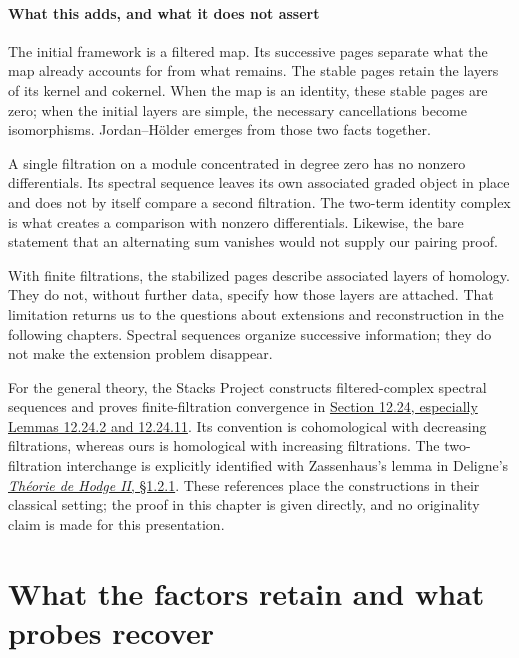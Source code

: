 \documentclass[11pt]{article}
\theoremstyle{definition}
\theoremstyle{remark}\newtheorem{remark}[theorem]{Remark}
\begin{document}
\subsection{What this adds, and what it does not assert}

The initial framework is a filtered map. Its successive pages separate
what the map already accounts for from what remains. The stable pages
retain the layers of its kernel and cokernel. When the map is an identity,
these stable pages are zero; when the initial layers are simple, the
necessary cancellations become isomorphisms. Jordan--H\"older emerges
from those two facts together.

A single filtration on a module concentrated in degree zero has no
nonzero differentials. Its spectral sequence leaves its own associated
graded object in place and does not by itself compare a second
filtration. The two-term identity complex is what creates a comparison
with nonzero differentials. Likewise, the bare statement that an
alternating sum vanishes would not supply our pairing proof.

With finite filtrations, the stabilized pages describe associated
layers of homology. They do not, without further data, specify how those
layers are attached. That limitation returns us to the questions about
extensions and reconstruction in the following chapters. Spectral
sequences organize successive information; they do not make the extension
problem disappear.

For the general theory, the Stacks Project constructs filtered-complex
spectral sequences and proves finite-filtration convergence in
\href{https://stacks.math.columbia.edu/tag/012K}{Section 12.24,
especially Lemmas 12.24.2 and 12.24.11}. Its convention is cohomological
with decreasing filtrations, whereas ours is homological with increasing
filtrations. The two-filtration interchange is explicitly identified
with Zassenhaus's lemma in Deligne's
\href{https://www.numdam.org/item/10.1007/BF02684692.pdf}{\emph{Th\'eorie
de Hodge II}, \S1.2.1}. These references place the constructions in their
classical setting; the proof in this chapter is given directly, and no
originality claim is made for this presentation.


\clearpage\part{What the factors retain and what probes recover}
\end{document}
